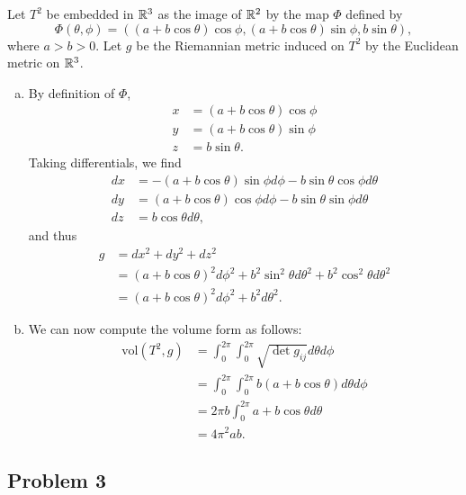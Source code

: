 \documentclass{../mathnotes}
\begin{document}
Let $T^2$ be embedded in $\mathbb{R}^3$ as the image of $\mathbb{R}^2$ by the map $\Phi$ defined by
\[\Phi(\theta,\phi) = \left( (a+b\cos\theta)\cos\phi,(a+b\cos\theta)\sin\phi,b\sin\theta \right),\]
where $a>b>0$. Let $g$ be the Riemannian metric induced on $T^2$ by the Euclidean metric on $\mathbb{R}^3$.
\begin{enumerate}[(a)]
    \item By definition of $\Phi$,
        \begin{align*}
            x &= (a+b\cos\theta)\cos\phi\\
            y &= (a+b\cos\theta)\sin\phi\\
            z &= b\sin\theta.
        \end{align*}
        Taking differentials, we find
        \begin{align*}
            dx &= -(a+b\cos\theta)\sin\phi d\phi-b\sin\theta\cos\phi d\theta\\
            dy &= (a+b\cos\theta)\cos\phi d\phi -b\sin\theta\sin\phi d\theta\\
            dz &= b\cos\theta d\theta,
        \end{align*}
        and thus
        \begin{align*}
            g &= dx^2+dy^2+dz^2\\
            &= (a+b\cos\theta)^2d\phi^2+b^2\sin^2\theta d\theta^2+b^2\cos^2\theta d\theta^2\\
            &= (a+b\cos\theta)^2d\phi^2+b^2d\theta^2.
        \end{align*}
    \item  We can now compute the volume form as follows:
        \begin{align*}
            \text{vol}(T^2,g) &= \int_0^{2\pi}\int_0^{2\pi} \sqrt{\det g_{ij}} d\theta d\phi\\
            &= \int_0^{2\pi}\int_0^{2\pi} b(a+b\cos\theta)d\theta d\phi\\
            &= 2\pi b\int_0^{2\pi}a+b\cos\theta d\theta\\
            &= 4\pi^2 ab.
        \end{align*}
\end{enumerate}

\subsection*{Problem 3}
\end{document}
